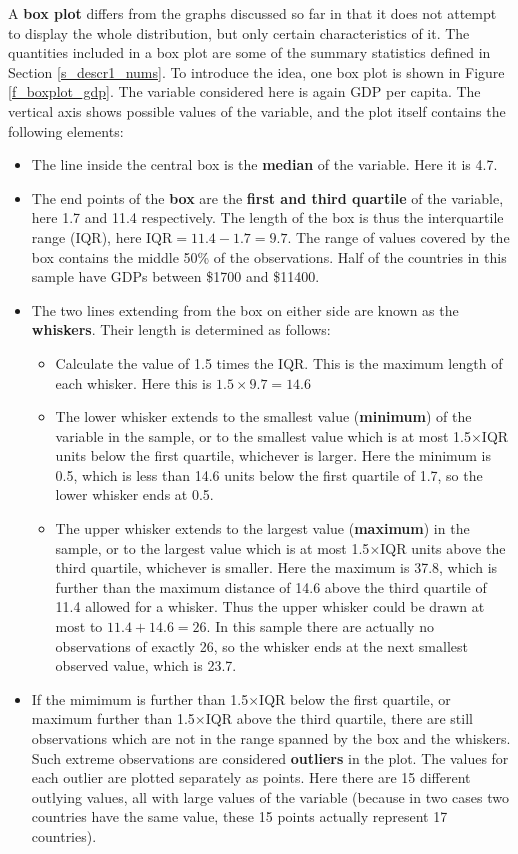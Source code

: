 A \textbf{box plot} differs from the graphs discussed so far in that it
does not attempt to display the whole distribution, but only certain
characteristics of it. The quantities included in a box plot are some of
the summary statistics defined in Section \ref{s_descr1_nums}. To
introduce the idea, one box plot is shown in Figure
\ref{f_boxplot_gdp}. The variable considered here is again GDP per capita.
The vertical axis shows possible values
of the variable, and the plot itself contains the following elements:
\begin{itemize}
\item
The line inside the central box is the \textbf{median} of the
variable. Here it is 4.7.
\item
The end points of the \textbf{box} are the \textbf{first and third quartile} of
the variable, here 1.7 and 11.4 respectively.
The length of the box is thus the interquartile range
(IQR), here $\text{IQR}=11.4-1.7=9.7$.
The range of values covered by the box contains the middle 50\%
of the observations. Half of the
countries in this sample have GDPs between \$1700 and \$11400.
\item
The two lines extending from the box on either side are known as the
\textbf{whiskers}. Their length is determined as
follows:
\begin{itemize}
\item
Calculate the value of 1.5 times the IQR. This is the maximum length of
each whisker. Here this is $1.5\times 9.7=14.6$
\item
The lower whisker extends to the smallest value (\textbf{minimum}) of the
variable in the sample, or to the smallest value which
is at most 1.5$\times$IQR units below the first quartile, whichever is
larger. Here the minimum is 0.5, which is less than 14.6
units below the
first quartile of 1.7, so the lower whisker ends at 0.5.
\item
The upper whisker extends to the largest value (\textbf{maximum})
in the sample, or to the largest value which
is at most 1.5$\times$IQR units above the third quartile, whichever is
smaller. Here the maximum is 37.8, which is further than the maximum
distance of 14.6 above the third quartile of 11.4 allowed for a
whisker. Thus the upper whisker could be drawn at most to $11.4+14.6=26$.
In this
sample there are actually no observations of exactly 26, so the whisker
ends at the next smallest observed value, which is 23.7.
\end{itemize}
\item
If the mimimum is further than 1.5$\times$IQR below the first quartile,
or maximum further than 1.5$\times$IQR above the third quartile, there
are still observations which are not in the range spanned by the box and
the whiskers. Such extreme observations are considered \textbf{outliers}
in the plot. The values for each outlier are plotted separately as
points. Here there are 15 different outlying values, all with large
values of the variable (because in two cases two countries have the same
value, these 15 points actually represent 17 countries).
\end{itemize}
